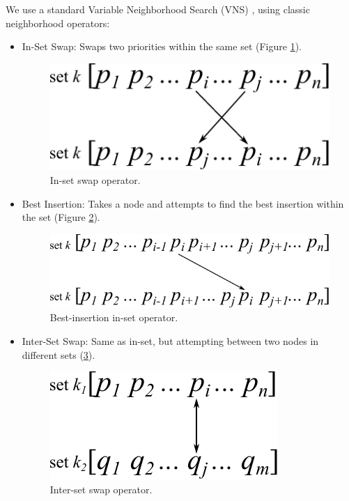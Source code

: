 We use a standard Variable Neighborhood Search (VNS) \cite{hansen2006variable}, using classic neighborhood operators:
\begin{itemize}
\item In-Set Swap: Swaps two priorities within the same set (Figure \ref{fig:inset_swap}).
\begin{figure}[H]
    \centering
    \includegraphics[scale=0.75]{files/inset_swap.pdf}
    \caption{In-set swap operator.}
    \label{fig:inset_swap}
\end{figure}
\item Best Insertion: Takes a node and attempts to find the best insertion within the set (Figure \ref{fig:best_ins}).
\begin{figure}[H]
    \centering
    \includegraphics[scale=0.75]{files/bset_insert.pdf}
    \caption{Best-insertion in-set operator.}
    \label{fig:best_ins}
\end{figure}
\item Inter-Set Swap: Same as in-set, but attempting between two nodes in different sets (\ref{fig:inter_swap}).
\begin{figure}[H]
    \centering
    \includegraphics[scale=0.75]{files/interset_swap.pdf}
    \caption{Inter-set swap operator.}
    \label{fig:inter_swap}
\end{figure}
\end{itemize}

